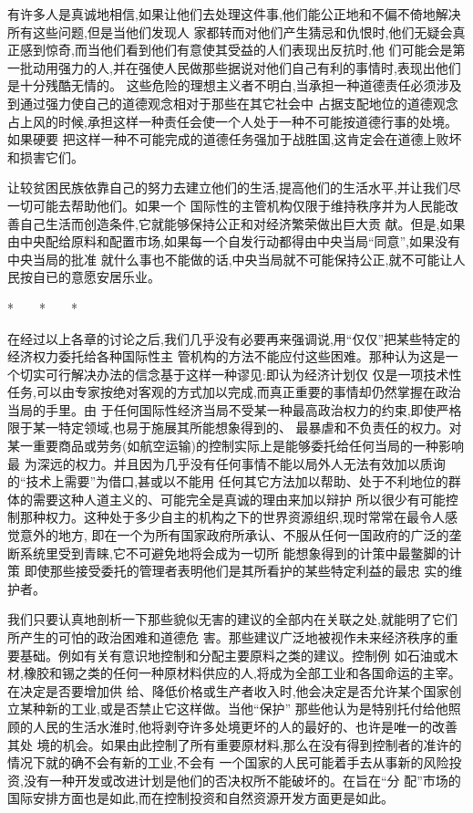 ﻿\documentclass[12pt]{article}
\begin{document}
有许多人是真诚地相信,如果让他们去处理这件事,他们能公正地和不偏不倚地解决所有这些问题,但是当他们发现人
家都转而对他们产生猜忌和仇恨时,他们无疑会真正感到惊奇,而当他们看到他们有意使其受益的人们表现出反抗时,他
们可能会是第一批动用强力的人,并在强使人民做那些据说对他们自己有利的事情时,表现出他们是十分残酷无情的。
这些危险的理想主义者不明白,当承担一种道德责任必须涉及到通过强力使自己的道德观念相对于那些在其它社会中
占据支配地位的道德观念占上风的时候,承担这样一种责任会使一个人处于一种不可能按道德行事的处境。如果硬要
把这样一种不可能完成的道德任务强加于战胜国,这肯定会在道德上败坏和损害它们。

让较贫困民族依靠自己的努力去建立他们的生活,提高他们的生活水平,并让我们尽一切可能去帮助他们。如果一个
国际性的主管机构仅限于维持秩序并为人民能改善自己生活而创造条件,它就能够保持公正和对经济繁荣做出巨大贡
献。但是,如果由中央配给原料和配置市场,如果每一个自发行动都得由中央当局``同意'',如果没有中央当局的批准
就什么事也不能做的话,中央当局就不可能保持公正,就不可能让人民按自已的意愿安居乐业。

*　　*　　*

在经过以上各章的讨论之后,我们几乎没有必要再来强调说,用``仅仅''把某些特定的经济权力委托给各种国际性主
管机构的方法不能应付这些困难。那种认为这是一个切实可行解决办法的信念基于这样一种谬见:即认为经济计划仅
仅是一项技术性任务,可以由专家按绝对客观的方式加以完成,而真正重要的事情却仍然掌握在政治当局的手里。由
于任何国际性经济当局不受某一种最高政治权力的约束,即使严格限于某一特定领域,也易于施展其所能想象得到的、
最暴虐和不负责任的权力。对某一重要商品或劳务(如航空运输)的控制实际上是能够委托给任何当局的一种影响最
为深远的权力。并且因为几乎没有任何事情不能以局外人无法有效加以质询的``技术上需要''为借口,甚或以不能用
任何其它方法加以帮助、处于不利地位的群体的需要这种人道主义的、可能完全是真诚的理由来加以辩护 \myrule
所以很少有可能控制那种权力。这种处于多少自主的机构之下的世界资源组织,现时常常在最令人感觉意外的地方,
即在一个为所有国家政府所承认、不服从任何一国政府的广泛的垄断系统里受到青睐,它不可避免地将会成为一切所
能想象得到的计策中最鳖脚的计策 \myrule 即使那些接受委托的管理者表明他们是其所看护的某些特定利益的最忠
实的维护者。

我们只要认真地剖析一下那些貌似无害的建议的全部内在关联之处,就能明了它们所产生的可怕的政治困难和道德危
害。那些建议广泛地被视作未来经济秩序的重要基础。例如有关有意识地控制和分配主要原料之类的建议。控制例
如石油或木材,橡胶和锡之类的任何一种原材料供应的人,将成为全部工业和各国命运的主宰。在决定是否要增加供
给、降低价格或生产者收入时,他会决定是否允许某个国家创立某种新的工业,或是否禁止它这样做。当他``保护''
那些他认为是特别托付给他照顾的人民的生活水淮时,他将剥夺许多处境更坏的人的最好的、也许是唯一的改善其处
境的机会。如果由此控制了所有重要原材料,那么在没有得到控制者的准许的情况下就的确不会有新的工业,不会有
一个国家的人民可能着手去从事新的风险投资,没有一种开发或改进计划是他们的否决权所不能破坏的。在旨在``分
配''市场的国际安排方面也是如此,而在控制投资和自然资源开发方面更是如此。
\end{document}
